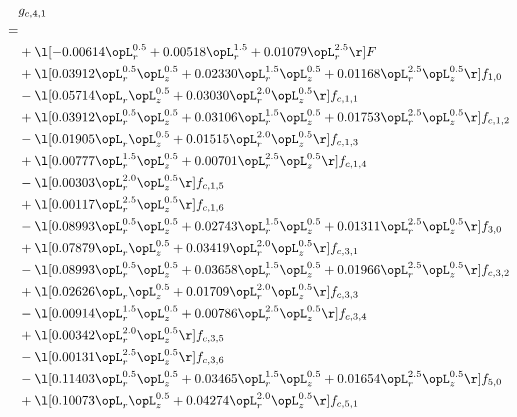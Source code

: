 \begin{alignat}{2} 
\label{eq:g_41_0} 
& g_{c,4,1} \nonumber \\ 
 = \\ 
& + \l[  -0.00614 \opL_r^{0.5} +  0.00518 \opL_r^{1.5} +  0.01079 \opL_r^{2.5}  \r] F \nonumber \\ 
& + \l[  0.03912 \opL_r^{0.5} \opL_z^{0.5} +  0.02330 \opL_r^{1.5} \opL_z^{0.5} +  0.01168 \opL_r^{2.5} \opL_z^{0.5}  \r] f_{1,0} \nonumber \\ 
& - \l[  0.05714 \opL_r \opL_z^{0.5} +  0.03030 \opL_r^{2.0} \opL_z^{0.5}  \r] f_{c,1,1} \nonumber \\ 
& + \l[  0.03912 \opL_r^{0.5} \opL_z^{0.5} +  0.03106 \opL_r^{1.5} \opL_z^{0.5} +  0.01753 \opL_r^{2.5} \opL_z^{0.5}  \r] f_{c,1,2} \nonumber \\ 
& - \l[  0.01905 \opL_r \opL_z^{0.5} +  0.01515 \opL_r^{2.0} \opL_z^{0.5}  \r] f_{c,1,3} \nonumber \\ 
& + \l[  0.00777 \opL_r^{1.5} \opL_z^{0.5} +  0.00701 \opL_r^{2.5} \opL_z^{0.5}  \r] f_{c,1,4} \nonumber \\ 
& - \l[  0.00303 \opL_r^{2.0} \opL_z^{0.5}  \r] f_{c,1,5} \nonumber \\ 
& + \l[  0.00117 \opL_r^{2.5} \opL_z^{0.5}  \r] f_{c,1,6} \nonumber \\ 
& - \l[  0.08993 \opL_r^{0.5} \opL_z^{0.5} +  0.02743 \opL_r^{1.5} \opL_z^{0.5} +  0.01311 \opL_r^{2.5} \opL_z^{0.5}  \r] f_{3,0} \nonumber \\ 
& + \l[  0.07879 \opL_r \opL_z^{0.5} +  0.03419 \opL_r^{2.0} \opL_z^{0.5}  \r] f_{c,3,1} \nonumber \\ 
& - \l[  0.08993 \opL_r^{0.5} \opL_z^{0.5} +  0.03658 \opL_r^{1.5} \opL_z^{0.5} +  0.01966 \opL_r^{2.5} \opL_z^{0.5}  \r] f_{c,3,2} \nonumber \\ 
& + \l[  0.02626 \opL_r \opL_z^{0.5} +  0.01709 \opL_r^{2.0} \opL_z^{0.5}  \r] f_{c,3,3} \nonumber \\ 
& - \l[  0.00914 \opL_r^{1.5} \opL_z^{0.5} +  0.00786 \opL_r^{2.5} \opL_z^{0.5}  \r] f_{c,3,4} \nonumber \\ 
& + \l[  0.00342 \opL_r^{2.0} \opL_z^{0.5}  \r] f_{c,3,5} \nonumber \\ 
& - \l[  0.00131 \opL_r^{2.5} \opL_z^{0.5}  \r] f_{c,3,6} \nonumber \\ 
& - \l[  0.11403 \opL_r^{0.5} \opL_z^{0.5} +  0.03465 \opL_r^{1.5} \opL_z^{0.5} +  0.01654 \opL_r^{2.5} \opL_z^{0.5}  \r] f_{5,0} \nonumber \\ 
& + \l[  0.10073 \opL_r \opL_z^{0.5} +  0.04274 \opL_r^{2.0} \opL_z^{0.5}  \r] f_{c,5,1} \nonumber \\ 

\end{alignat}

